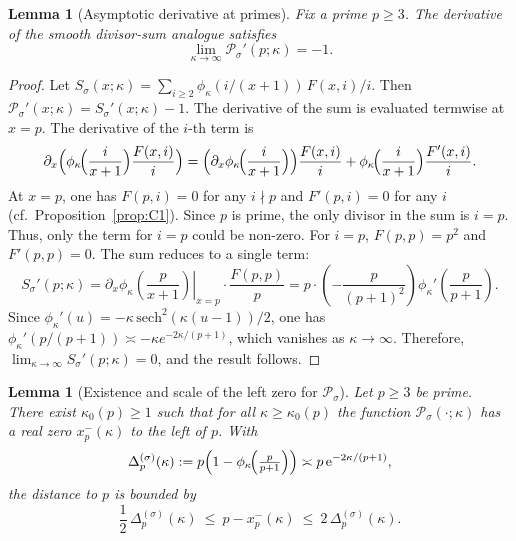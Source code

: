 \documentclass[11pt,a4paper]{amsart}
\theoremstyle{plain}
\newtheorem{lemma}[theorem]{Lemma}
\theoremstyle{definition}
\theoremstyle{remark}
\begin{document}
\begin{lemma}[Asymptotic derivative at primes]\label{lem:Psigma-derivative-at-p}
Fix a prime $p\ge 3$. The derivative of the smooth divisor-sum analogue satisfies
\[
\lim_{\kappa\to\infty} \mathcal{P}_\sigma'(p;\kappa) = -1.
\]
\end{lemma}
\begin{proof}
Let $S_\sigma(x;\kappa) = \sum_{i\ge 2}\phi_\kappa(i/(x+1))\,F(x,i)/i$. Then $\mathcal{P}_\sigma'(x;\kappa) = S_\sigma'(x;\kappa)-1$. The derivative of the sum is evaluated termwise at $x=p$. The derivative of the $i$-th term is
\[
\partial_x\Bigl(\phi_\kappa\!\Bigl(\frac{i}{x+1}\Bigr)\frac{F(x,i)}{i}\Bigr) =
\Bigl(\partial_x\phi_\kappa\!\Bigl(\frac{i}{x+1}\Bigr)\Bigr)\frac{F(x,i)}{i} + \phi_\kappa\!\Bigl(\frac{i}{x+1}\Bigr)\frac{F'(x,i)}{i}.
\]
At $x=p$, one has $F(p,i)=0$ for any $i\nmid p$ and $F'(p,i)=0$ for any $i$ (cf.\ Proposition~\ref{prop:C1}). Since $p$ is prime, the only divisor in the sum is $i=p$. Thus, only the term for $i=p$ could be non-zero. For $i=p$, $F(p,p)=p^2$ and $F'(p,p)=0$. The sum reduces to a single term:
\[
S_\sigma'(p;\kappa) = \left. \partial_x\phi_\kappa\!\left(\frac{p}{x+1}\right)\right|_{x=p} \cdot \frac{F(p,p)}{p}
= p \cdot \left(-\frac{p}{(p+1)^2}\right) \phi_\kappa'\!\left(\frac{p}{p+1}\right).
\]
Since $\phi_\kappa'(u) = -\kappa\,\mathrm{sech}^2(\kappa(u-1))/2$, one has $\phi_\kappa'(p/(p+1)) \asymp -\kappa e^{-2\kappa/(p+1)}$, which vanishes as $\kappa\to\infty$. Therefore, $\lim_{\kappa\to\infty} S_\sigma'(p;\kappa) = 0$, and the result follows.
\end{proof}


\begin{lemma}[Existence and scale of the left zero for $\mathcal P_\sigma$]\label{lem:Psigma-left-zero}
Let $p\ge3$ be prime. There exist $\kappa_0(p)\ge1$ such that for all $\kappa\ge\kappa_0(p)$ the function $\mathcal P_\sigma(\cdot;\kappa)$ has a real zero $x_p^-(\kappa)$ to the left of $p$. With
\[
\Delta_p^{(\sigma)}(\kappa):=p\Bigl(1-\phi_\kappa\!\Bigl(\tfrac{p}{p+1}\Bigr)\Bigr)\asymp p\,\mathrm e^{-2\kappa/(p+1)},
\]
the distance to $p$ is bounded by
\[
\frac{1}{2}\,\Delta_p^{(\sigma)}(\kappa)\ \le\ p-x_p^-(\kappa)\ \le\ 2\,\Delta_p^{(\sigma)}(\kappa).
\]
\end{lemma}
\end{document}
